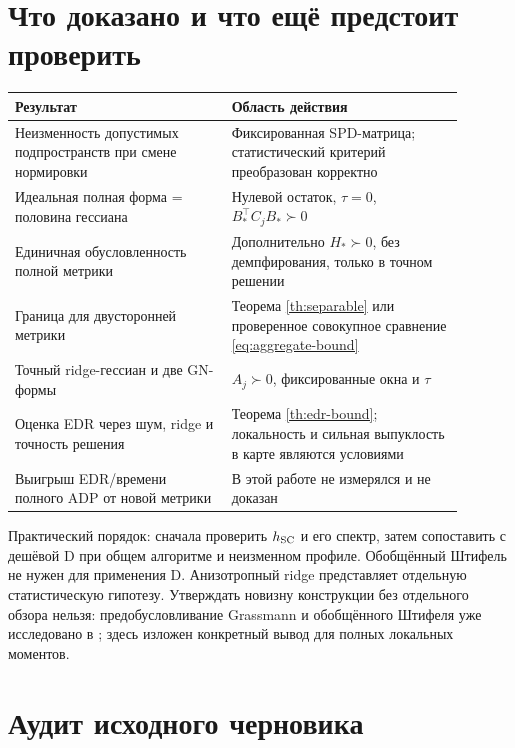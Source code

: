 \documentclass[11pt,a4paper]{article}
\theoremstyle{remark}
\begin{document}
\section{Что доказано и что ещё предстоит проверить}

\begin{center}\small
\begin{tabular}{p{0.43\linewidth}p{0.46\linewidth}}
\toprule
Результат & Область действия\\\midrule
Неизменность допустимых подпространств при смене нормировки &
Фиксированная SPD-матрица; статистический критерий преобразован корректно\\
Идеальная полная форма = половина гессиана &
Нулевой остаток, $\tau=0$, $B_*^\top C_jB_*\succ0$\\
Единичная обусловленность полной метрики &
Дополнительно $H_*\succ0$, без демпфирования, только в точном решении\\
Граница для двусторонней метрики &
Теорема \ref{th:separable} или проверенное совокупное сравнение
\eqref{eq:aggregate-bound}\\
Точный ridge-гессиан и две GN-формы &
$A_j\succ0$, фиксированные окна и $\tau$\\
Оценка EDR через шум, ridge и точность решения &
Теорема \ref{th:edr-bound}; локальность и сильная выпуклость в карте
являются условиями\\
Выигрыш EDR/времени полного ADP от новой метрики &
В этой работе не измерялся и не доказан\\
\bottomrule
\end{tabular}
\end{center}

Практический порядок: сначала проверить $h_{\rm SC}$ и его спектр,
затем сопоставить с дешёвой D при общем алгоритме и неизменном профиле.
Обобщённый Штифель не нужен для применения D.
Анизотропный ridge представляет отдельную статистическую гипотезу.
Утверждать новизну конструкции без отдельного обзора нельзя:
предобусловливание Grassmann и обобщённого Штифеля уже исследовано
в \cite{boumal,shustin}; здесь изложен конкретный вывод для полных
локальных моментов.

\appendix
\section{Аудит исходного черновика}
\end{document}

